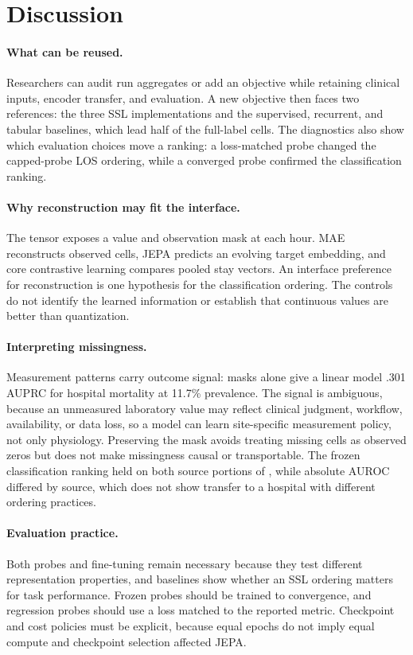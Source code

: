 \section{Discussion}
\label{sec:discussion}

\paragraph{What can be reused.}
Researchers can audit run aggregates or add an objective while retaining clinical inputs, encoder transfer, and evaluation. A new objective then faces two references: the three SSL implementations and the supervised, recurrent, and tabular baselines, which lead half of the full-label cells. The diagnostics also show which evaluation choices move a ranking: a loss-matched probe changed the capped-probe LOS ordering, while a converged probe confirmed the classification ranking.

\paragraph{Why reconstruction may fit the interface.}
The tensor exposes a value and observation mask at each hour. MAE reconstructs observed cells, JEPA predicts an evolving target embedding, and core contrastive learning compares pooled stay vectors. An interface preference for reconstruction is one hypothesis for the classification ordering. The controls do not identify the learned information or establish that continuous values are better than quantization.

\paragraph{Interpreting missingness.}
Measurement patterns carry outcome signal: masks alone give a linear model .301 AUPRC for \MIMIC{} hospital mortality at 11.7\% prevalence. The signal is ambiguous, because an unmeasured laboratory value may reflect clinical judgment, workflow, availability, or data loss, so a model can learn site-specific measurement policy, not only physiology. Preserving the mask avoids treating missing cells as observed zeros but does not make missingness causal or transportable. The frozen classification ranking held on both source portions of \Combined{}, while absolute AUROC differed by source, which does not show transfer to a hospital with different ordering practices.

\paragraph{Evaluation practice.}
Both probes and fine-tuning remain necessary because they test different representation properties, and baselines show whether an SSL ordering matters for task performance. Frozen probes should be trained to convergence, and regression probes should use a loss matched to the reported metric. Checkpoint and cost policies must be explicit, because equal epochs do not imply equal compute and checkpoint selection affected JEPA.
